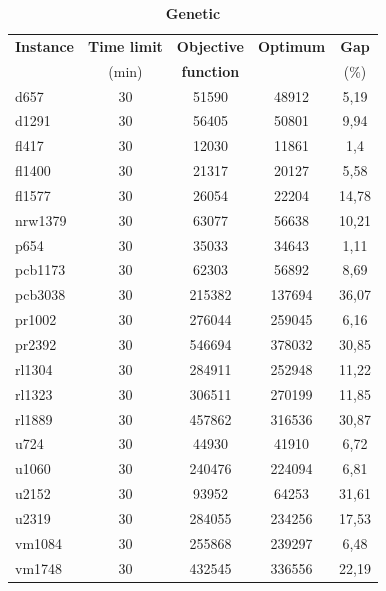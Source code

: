 \begin{table}[h!]
	\begin{center}
		\caption{\textbf{\large Genetic}}
		\begin{tabular}{l|c|c|c|c}
			\textbf{Instance} & \textbf{Time limit} & \textbf{Objective} & \textbf{Optimum} & \textbf{ Gap } \\
			& (min) & \textbf{function} & & (\%)\\
			\hline
			d657 & 30 & 51590 & 48912 & 5,19 \\
			d1291 & 30 & 56405 & 50801 & 9,94  \\
			fl417 & 30 & 12030 & 11861 & 1,4\\
			fl1400 & 30 & 21317 & 20127 &  5,58 \\
			fl1577 & 30 & 26054 & 22204 &  14,78\\
			nrw1379 & 30 & 63077 & 56638 & 10,21 \\
			p654 & 30 & 35033 & 34643 & 1,11 \\
			pcb1173 & 30 & 62303 & 56892 & 8,69  \\
			pcb3038 & 30 & 215382 & 137694 & 36,07  \\
			pr1002 & 30 & 276044 & 259045 & 6,16  \\
			pr2392 & 30 & 546694 & 378032 & 30,85 \\
			rl1304 & 30 & 284911 & 252948 & 11,22  \\
			rl1323 & 30  & 306511 & 270199 &  11,85 \\
			rl1889 & 30 & 457862 & 316536 & 30,87 \\
			u724 & 30 & 44930 & 41910 & 6,72 \\
			u1060 & 30 & 240476 & 224094 & 6,81  \\
			u2152 & 30 & 93952 & 64253 & 31,61 \\
			u2319 & 30 & 284055 & 234256 & 17,53 \\
			vm1084 & 30 & 255868 & 239297 & 6,48  \\
			vm1748 & 30 & 432545 & 336556 & 22,19 \\
		\end{tabular}
	\end{center}
\end{table}

